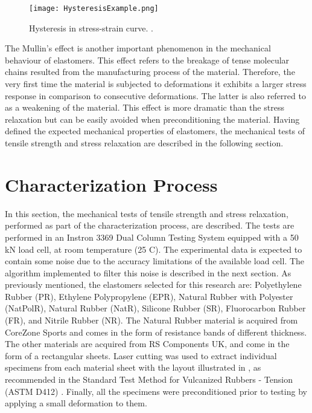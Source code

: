 \begin{figure}[htb!]
    \centering
    \texttt{[image: HysteresisExample.png]}
    \caption[Hysteresis in stress-strain curve.]{Hysteresis in stress-strain curve. \cite{Bauman2008}.}
    \label{fig:hysteresis}
\end{figure}

The Mullin's effect is another important phenomenon in the mechanical behaviour of elastomers. This effect refers to the breakage of tense molecular chains resulted from the manufacturing process of the material. Therefore, the very first time the material is subjected to deformations it exhibits a larger stress response in comparison to consecutive deformations. The latter is also referred to as a weakening of the material. This effect is more dramatic than the stress relaxation but can be easily avoided when preconditioning the material. Having defined the expected mechanical properties of elastomers, the mechanical tests of tensile strength and stress relaxation are described in the following section.

\section{Characterization Process} \label{sec:CharacterizationProcess}

In this section, the mechanical tests of tensile strength and stress relaxation, performed as part of the characterization process, are described. The tests are performed in an Instron 3369 Dual Column Testing System equipped with a 50 kN load cell, at room temperature (25 \degree{} C). The experimental data is expected to contain some noise due to the accuracy limitations of the available load cell. The algorithm implemented to filter this noise is described in the next section. As previously mentioned, the elastomers selected for this research are: Polyethylene Rubber (PR), Ethylene Polypropylene (EPR), Natural Rubber with Polyester (NatPolR), Natural Rubber (NatR), Silicone Rubber (SR), Fluorocarbon Rubber (FR), and Nitrile Rubber (NR). The Natural Rubber material is acquired from CoreZone Sports\textregistered{} and comes in the form of resistance bands of different thickness. The other materials are acquired from RS Components UK\textregistered{}, and come in the form of a rectangular sheets. Laser cutting was used to extract individual specimens from each material sheet with the layout illustrated in , as recommended in the Standard Test Method for Vulcanized Rubbers - Tension (ASTM D412) \cite{astmd412}. Finally, all the specimens were preconditioned prior to testing by applying a small deformation to them.

